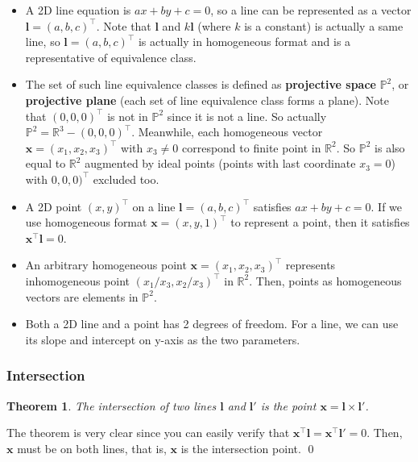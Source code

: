 \documentclass[12pt]{article}
\newtheorem{theorem}{Theorem}[section]
\numberwithin{equation}{section}
\renewenvironment{proof}{{\bfseries Proof.}}{\qed \\}
\begin{document}
\begin{itemize}
\item A 2D line equation is $ax + by + c = 0$, so a line can be represented as a vector $\mathbf{l} = (a,b,c)^\top$. Note that $\mathbf{l}$ and $k\mathbf{l}$ (where $k$ is a constant) is actually a same line, so $\mathbf{l} = (a,b,c)^\top$ is actually in homogeneous format and is a representative of equivalence class.

\item The set of such line equivalence classes is defined as \textbf{projective space} $\mathbb{P}^2$, or \textbf{projective plane} (each set of line equivalence class forms a plane). Note that $(0,0,0)^\top$ is not in $\mathbb{P}^2$ since it is not a line. So actually $\mathbb{P}^2 = \mathbb{R}^3 - (0,0,0)^\top$. Meanwhile, each homogeneous vector $\mathbf{x} = (x_1, x_2, x_3)^\top$ with $x_3 \neq 0$ correspond to finite point in $\mathbb{R}^2$. So $\mathbb{P}^2$ is also equal to $\mathbb{R}^2$ augmented by ideal points (points with last coordinate $x_3 = 0$) with $0,0,0)^\top$ excluded too.

\item A 2D point $(x,y)^\top$ on a line $\mathbf{l} = (a,b,c)^\top$ satisfies $ax + by + c = 0$. If we use homogeneous format $\mathbf{x} = (x,y,1)^\top$ to represent a point, then it satisfies $\mathbf{x^\top l} = 0$.
\item An arbitrary homogeneous point $\mathbf{x} = (x_1, x_2, x_3)^\top$ represents inhomogeneous point $(x_1 / x_3, x_2 / x_3)^\top$ in $\mathbb{R}^2$. Then, points as homogeneous vectors are elements in $\mathbb{P}^2$.
\item Both a 2D line and a point has 2 degrees of freedom. For a line, we can use its slope and intercept on y-axis as the two parameters.
\end{itemize}

\subsubsection{Intersection}
\label{sec:2d:intersection}

\begin{theorem}
The intersection of two lines $\mathbf{l}$ and $\mathbf{l}'$ is the point $\mathbf{x} = \mathbf{l} \times \mathbf{l}'$.
\label{theorem:line_itsn}
\end{theorem}
\begin{proof}
The theorem is very clear since you can easily verify that $\mathbf{x}^\top \mathbf{l} = \mathbf{x}^\top \mathbf{l}' = 0$. Then, $\mathbf{x}$ must be on both lines, that is,  $\mathbf{x}$ is the intersection point.
\end{proof}
\end{document}
